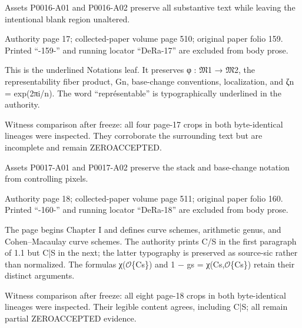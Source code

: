 \documentclass[11pt,a4paper]{article}
\begin{document}
Assets P0016-A01 and P0016-A02 preserve all substantive text while leaving the intentional blank region unaltered.


\par\medskip
\hypertarget{D018-P0017}{}
\par\smallskip
Authority page 17; collected-paper volume page 510; original paper folio 159. Printed “-159-” and running locator “DeRa-17” are excluded from body prose.

This is the underlined Notations leaf. It preserves φ : \ensuremath{\mathfrak{M}}\textunderscore{}1 → \ensuremath{\mathfrak{M}}\textunderscore{}2, the representability fiber product, G\textunderscore{}n, base-change conventions, localization, and ζ\textunderscore{}n = exp(2πi/n). The word “représentable” is typographically underlined in the authority.

Witness comparison after freeze: all four page-17 crops in both byte-identical lineages were inspected. They corroborate the surrounding text but are incomplete and remain ZERO\textunderscore{}ACCEPTED.

Assets P0017-A01 and P0017-A02 preserve the stack and base-change notation from controlling pixels.


\par\medskip
\hypertarget{D018-P0018}{}
\par\smallskip
Authority page 18; collected-paper volume page 511; original paper folio 160. Printed “-160-” and running locator “DeRa-18” are excluded from body prose.

The page begins Chapter I and defines curve schemes, arithmetic genus, and Cohen–Macaulay curve schemes. The authority prints C/S in the first paragraph of 1.1 but C|S in the next; the latter typography is preserved as source-sic rather than normalized. The formulas χ(\ensuremath{\mathcal{O}}\textunderscore{}\{C\textunderscore{}s\}) and 1 − g\textunderscore{}s = χ(C\textunderscore{}s,\ensuremath{\mathcal{O}}\textunderscore{}\{C\textunderscore{}s\}) retain their distinct arguments.

Witness comparison after freeze: all eight page-18 crops in both byte-identical lineages were inspected. Their legible content agrees, including C|S; all remain partial ZERO\textunderscore{}ACCEPTED evidence.
\end{document}
